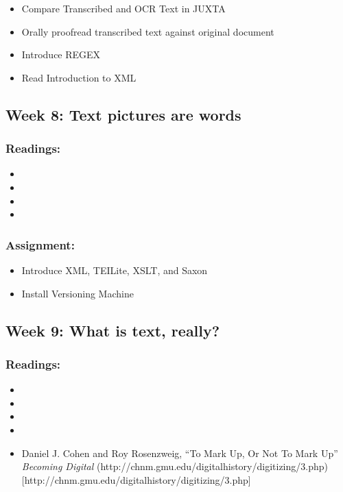 \documentclass[]{article}
\begin{document}
\begin{itemize}
\itemsep1pt\parskip0pt
\item
  Compare Transcribed and OCR Text in JUXTA\\
\item
  Orally proofread transcribed text against original document
\item
  Introduce REGEX
\item
  Read Introduction to XML
\end{itemize}

\subsection{Week 8: Text pictures are
words}\label{week-8-text-pictures-are-words}

\subsubsection{Readings:}\label{readings-6}

\begin{itemize}
\item
\item
\item
\item
\end{itemize}

\subsubsection{Assignment:}\label{assignment-6}

\begin{itemize}
\itemsep1pt\parskip0pt
\item
  Introduce XML, TEILite, XSLT, and Saxon
\item
  Install Versioning Machine
\end{itemize}

\subsection{Week 9: What is text,
really?}\label{week-9-what-is-text-really}

\subsubsection{Readings:}\label{readings-7}

\begin{itemize}
\item
\item
\item
\item
\item
  Daniel J. Cohen and Roy Rosenzweig, ``To Mark Up, Or Not To Mark Up''
  \emph{Becoming Digital}
  (http://chnm.gmu.edu/digitalhistory/digitizing/3.php){[}http://chnm.gmu.edu/digitalhistory/digitizing/3.php{]}
\end{itemize}
\end{document}
